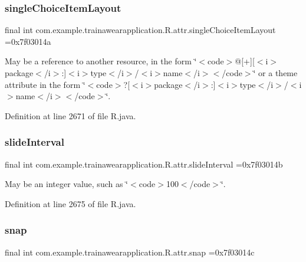 \subsubsection{\texorpdfstring{singleChoiceItemLayout}{singleChoiceItemLayout}}
{\footnotesize\ttfamily final int com.\+example.\+trainawearapplication.\+R.\+attr.\+single\+Choice\+Item\+Layout =0x7f03014a\hspace{0.3cm}{\ttfamily [static]}}

May be a reference to another resource, in the form \char`\"{}$<$code$>$@\mbox{[}+\mbox{]}\mbox{[}$<$i$>$package$<$/i$>$\+:\mbox{]}$<$i$>$type$<$/i$>$/$<$i$>$name$<$/i$>$$<$/code$>$\char`\"{} or a theme attribute in the form \char`\"{}$<$code$>$?\mbox{[}$<$i$>$package$<$/i$>$\+:\mbox{]}$<$i$>$type$<$/i$>$/$<$i$>$name$<$/i$>$$<$/code$>$\char`\"{}. 

Definition at line 2671 of file R.\+java.

\mbox{\label{classcom_1_1example_1_1trainawearapplication_1_1_r_1_1attr_afec03776e365a22289759fc596609843}} 
\subsubsection{\texorpdfstring{slideInterval}{slideInterval}}
{\footnotesize\ttfamily final int com.\+example.\+trainawearapplication.\+R.\+attr.\+slide\+Interval =0x7f03014b\hspace{0.3cm}{\ttfamily [static]}}

May be an integer value, such as \char`\"{}$<$code$>$100$<$/code$>$\char`\"{}. 

Definition at line 2675 of file R.\+java.

\mbox{\label{classcom_1_1example_1_1trainawearapplication_1_1_r_1_1attr_ac3ef4c169c269dd4d331d004c58c674a}} 
\subsubsection{\texorpdfstring{snap}{snap}}
{\footnotesize\ttfamily final int com.\+example.\+trainawearapplication.\+R.\+attr.\+snap =0x7f03014c\hspace{0.3cm}{\ttfamily [static]}}

